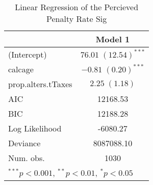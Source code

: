 
\begin{table}
\begin{tabular}{l c }
\hline
 & Model 1 \\
\hline
(Intercept)        & $76.01 \; (12.54)^{***}$ \\
calcage            & $-0.81 \; (0.20)^{***}$  \\
prop.alters.tTaxes & $2.25 \; (1.18)$         \\
\hline
AIC                & 12168.53                 \\
BIC                & 12188.28                 \\
Log Likelihood     & -6080.27                 \\
Deviance           & 8087088.10               \\
Num. obs.          & 1030                     \\
\hline
\multicolumn{2}{l}{\scriptsize{$^{***}p<0.001$, $^{**}p<0.01$, $^*p<0.05$}}
\end{tabular}
\caption{Linear Regression of the Percieved Penalty Rate Sig}
\label{table:coefficients}
\end{table}
